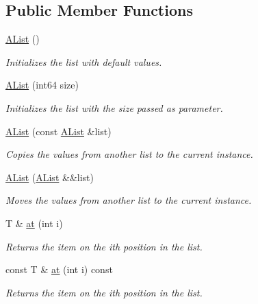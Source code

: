 \subsection*{Public Member Functions}
\begin{DoxyCompactItemize}
\item 
\mbox{\label{class_a_list_a0a4bc6509f21976058b3bd0b4fbc5d31}} 
\mbox{\hyperlink{class_a_list_a0a4bc6509f21976058b3bd0b4fbc5d31}{A\+List}} ()
\begin{DoxyCompactList}\small\item\em Initializes the list with default values. \end{DoxyCompactList}\item 
\mbox{\hyperlink{class_a_list_a8cec560bb9216051a7f2ba0676d6aabf}{A\+List}} (int64 size)
\begin{DoxyCompactList}\small\item\em Initializes the list with the size passed as parameter. \end{DoxyCompactList}\item 
\mbox{\hyperlink{class_a_list_a6009559ea4861f2a9263e447485dfeb2}{A\+List}} (const \mbox{\hyperlink{class_a_list}{A\+List}} \&list)
\begin{DoxyCompactList}\small\item\em Copies the values from another list to the current instance. \end{DoxyCompactList}\item 
\mbox{\hyperlink{class_a_list_a0e4ad9eb6d7cbb883a56f67589c65be9}{A\+List}} (\mbox{\hyperlink{class_a_list}{A\+List}} \&\&list)
\begin{DoxyCompactList}\small\item\em Moves the values from another list to the current instance. \end{DoxyCompactList}\item 
T \& \mbox{\hyperlink{class_a_list_ae43013270783ff87b26c3dc559874681}{at}} (int i)
\begin{DoxyCompactList}\small\item\em Returns the item on the ith position in the list. \end{DoxyCompactList}\item 
const T \& \mbox{\hyperlink{class_a_list_a10107fe182383d368c18992eb5be7127}{at}} (int i) const
\begin{DoxyCompactList}\small\item\em Returns the item on the ith position in the list. \end{DoxyCompactList}\item 

\end{DoxyCompactItemize}
